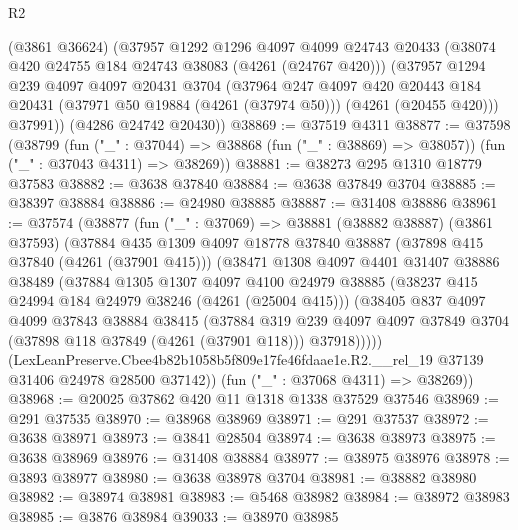 \begin{lexlean}{R2}
\begin{coremodule}
      (@3861 @36624)
      (@37957
        @1292
        @1296
        @4097
        @4099
        @24743
        @20433
        (@38074 @420 @24755 @184 @24743 @38083 (@4261 (@24767 @420)))
        (@37957
          @1294
          @239
          @4097
          @4097
          @20431
          @3704
          (@37964
            @247
            @4097
            @420
            @20443
            @184
            @20431
            (@37971 @50 @19884 (@4261 (@37974 @50)))
            (@4261 (@20455 @420)))
          @37991))
      (@4286 @24742 @20430))
@38869 := @37519 @4311
@38877 := @37598
    (@38799
      (fun ("_" : @37044) => @38868 (fun ("_" : @38869) => @38057))
      (fun ("_" : @37043 @4311) => @38269))
@38881 := @38273 @295 @1310 @18779 @37583
@38882 := @3638 @37840
@38884 := @3638 @37849 @3704
@38885 := @38397 @38884
@38886 := @24980 @38885
@38887 := @31408 @38886
@38961 := @37574
    (@38877
      (fun ("_" : @37069) =>
      @38881
        (@38882 @38887)
        (@3861 @37593)
        (@37884
          @435
          @1309
          @4097
          @18778
          @37840
          @38887
          (@37898 @415 @37840 (@4261 (@37901 @415)))
          (@38471
            @1308
            @4097
            @4401
            @31407
            @38886
            @38489
            (@37884
              @1305
              @1307
              @4097
              @4100
              @24979
              @38885
              (@38237 @415 @24994 @184 @24979 @38246 (@4261 (@25004 @415)))
              (@38405
                @837
                @4097
                @4099
                @37843
                @38884
                @38415
                (@37884
                  @319
                  @239
                  @4097
                  @4097
                  @37849
                  @3704
                  (@37898 @118 @37849 (@4261 (@37901 @118)))
                  @37918)))))
        (LexLeanPreserve.Cbee4b82b1058b5f809e17fe46fdaae1e.R2.__rel_19
          @37139
          @31406
          @24978
          @28500
          @37142))
      (fun ("_" : @37068 @4311) => @38269))
@38968 := @20025 @37862 @420 @11 @1318 @1338 @37529 @37546
@38969 := @291 @37535
@38970 := @38968 @38969
@38971 := @291 @37537
@38972 := @3638 @38971
@38973 := @3841 @28504
@38974 := @3638 @38973
@38975 := @3638 @38969
@38976 := @31408 @38884
@38977 := @38975 @38976
@38978 := @3893 @38977
@38980 := @3638 @38978 @3704
@38981 := @38882 @38980
@38982 := @38974 @38981
@38983 := @5468 @38982
@38984 := @38972 @38983
@38985 := @3876 @38984
@39033 := @38970
    @38985

\end{coremodule}
\end{lexlean}
